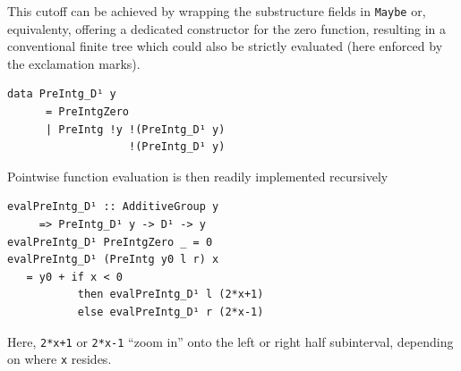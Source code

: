 \documentclass[sigplan,review,anonymous]{acmart}\settopmatter{printfolios=true,printccs=false,printacmref=false}
\begin{document}
This cutoff can be achieved by wrapping the substructure fields in \lstinline`Maybe` or, equivalenty, offering a dedicated constructor for the zero function, resulting in a conventional finite tree which could also be strictly evaluated (here enforced by the exclamation marks).
\begin{lstlisting}
data PreIntg_D¹ y
      = PreIntgZero
      | PreIntg !y !(PreIntg_D¹ y)
                   !(PreIntg_D¹ y)
\end{lstlisting}
Pointwise function evaluation is then readily implemented recursively
\begin{lstlisting}
evalPreIntg_D¹ :: AdditiveGroup y
     => PreIntg_D¹ y -> D¹ -> y
evalPreIntg_D¹ PreIntgZero _ = 0
evalPreIntg_D¹ (PreIntg y0 l r) x
   = y0 + if x < 0
           then evalPreIntg_D¹ l (2*x+1)
           else evalPreIntg_D¹ r (2*x-1)
\end{lstlisting}
Here, \lstinline`2*x+1` or \lstinline`2*x-1` “zoom in” onto the left or right half subinterval, depending on where \lstinline`x` resides.
\end{document}
